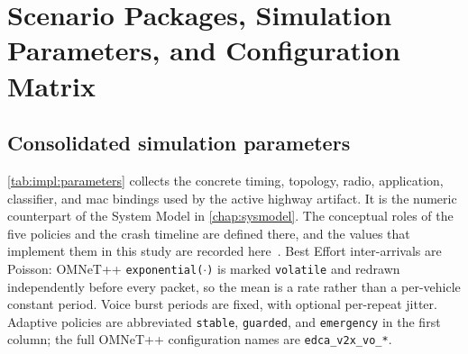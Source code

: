 \section{Scenario Packages, Simulation Parameters, and Configuration Matrix}
\label{sec:impl:scenarios}

\subsection{Consolidated simulation parameters}
\label{sec:impl:parameters}

\autoref{tab:impl:parameters} collects the concrete timing, topology, radio, application, classifier, and \gls{mac} bindings used by the active highway artifact.
It is the numeric counterpart of the System Model in \autoref{chap:sysmodel}.
The conceptual roles of the five policies and the crash timeline are defined there, and the values that implement them in this study are recorded here~\cite{aguiar2026_veins_qos}.
Best Effort inter-arrivals are Poisson: OMNeT++ \texttt{exponential($\cdot$)} is marked \texttt{volatile} and redrawn independently before every packet, so the mean is a rate rather than a per-vehicle constant period.
Voice burst periods are fixed, with optional per-repeat jitter.
Adaptive policies are abbreviated \texttt{stable}, \texttt{guarded}, and \texttt{emergency} in the first column; the full OMNeT++ configuration names are \texttt{edca\_v2x\_vo\_*}.

